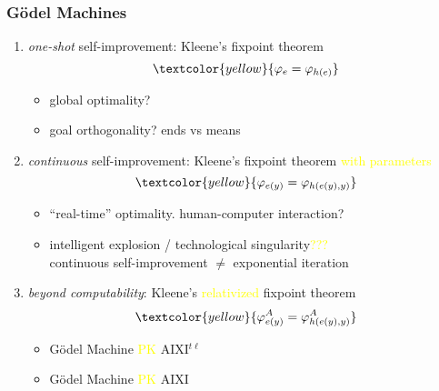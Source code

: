 \documentclass[UTF8,11pt,colorlinks,compress,openany]{beamer}%
\begin{document}
\begin{frame}\frametitle{G\"odel Machines}
\begin{enumerate}
	\item \emph{one-shot} self-improvement: Kleene's fixpoint theorem
	\[\textcolor{yellow}{\varphi_e=\varphi_{h(e)}}\]
	\begin{itemize}
		\item global optimality?
		\item goal orthogonality? ends vs means
	\end{itemize}
	\item \emph{continuous} self-improvement: Kleene's fixpoint theorem \textcolor{yellow}{with parameters}
	\[\textcolor{yellow}{\varphi_{e(y)}=\varphi_{h(e(y),y)}}\]
	\begin{itemize}
		\item ``real-time'' optimality. human-computer interaction?
		\item intelligent explosion / technological singularity\textcolor{yellow}{???}\\
		continuous self-improvement $\ne$ exponential iteration
	\end{itemize}
	\item \emph{beyond computability}: Kleene's \textcolor{yellow}{relativized} fixpoint theorem
	\[\textcolor{yellow}{\varphi_{e(y)}^A=\varphi_{h(e(y),y)}^A}\]
	\begin{itemize}
		\item G\"odel Machine \textcolor{yellow}{PK} AIXI$^{t\ell}$
		\item G\"odel Machine \textcolor{yellow}{PK} AIXI
	\end{itemize}
\end{enumerate}
\end{frame}
\end{document}
